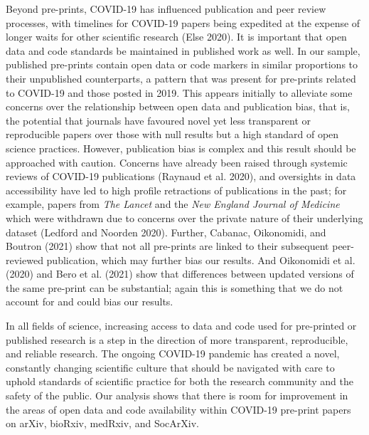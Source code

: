 \documentclass[
]{article}
\begin{document}
Beyond pre-prints, COVID-19 has influenced publication and peer review processes, with timelines for COVID-19 papers being expedited at the expense of longer waits for other scientific research (Else 2020). It is important that open data and code standards be maintained in published work as well. In our sample, published pre-prints contain open data or code markers in similar proportions to their unpublished counterparts, a pattern that was present for pre-prints related to COVID-19 and those posted in 2019. This appears initially to alleviate some concerns over the relationship between open data and publication bias, that is, the potential that journals have favoured novel yet less transparent or reproducible papers over those with null results but a high standard of open science practices. However, publication bias is complex and this result should be approached with caution. Concerns have already been raised through systemic reviews of COVID-19 publications (Raynaud et al. 2020), and oversights in data accessibility have led to high profile retractions of publications in the past; for example, papers from \emph{The Lancet} and the \emph{New England Journal of Medicine} which were withdrawn due to concerns over the private nature of their underlying dataset (Ledford and Noorden 2020). Further, Cabanac, Oikonomidi, and Boutron (2021) show that not all pre-prints are linked to their subsequent peer-reviewed publication, which may further bias our results. And Oikonomidi et al. (2020) and Bero et al. (2021) show that differences between updated versions of the same pre-print can be substantial; again this is something that we do not account for and could bias our results.

In all fields of science, increasing access to data and code used for pre-printed or published research is a step in the direction of more transparent, reproducible, and reliable research. The ongoing COVID-19 pandemic has created a novel, constantly changing scientific culture that should be navigated with care to uphold standards of scientific practice for both the research community and the safety of the public. Our analysis shows that there is room for improvement in the areas of open data and code availability within COVID-19 pre-print papers on arXiv, bioRxiv, medRxiv, and SocArXiv.
\end{document}
